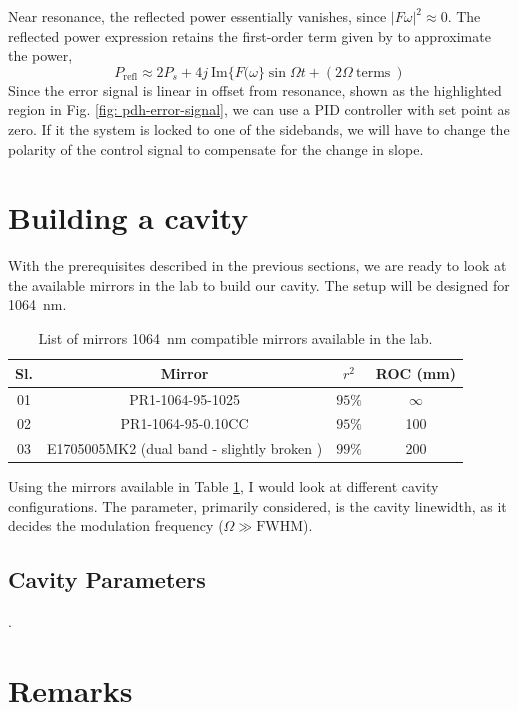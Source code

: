 \documentclass{Resources/cquicc}
\begin{document}
Near resonance, the reflected power essentially vanishes, since $|F \omega|^2 \approx 0$. The reflected power expression retains the first-order term given by to approximate the power, 
\begin{equation}
    P_{\text{refl}} \approx 2 P_s + 4 j~\mathrm{Im}\{F(\omega\}\sin \Omega t + (2\Omega ~\text{terms}~)
\end{equation}
Since the error signal is linear in offset from resonance, shown as the highlighted region in Fig. \ref{fig: pdh-error-signal}, we can use a PID controller with set point as zero. If it the system is locked to one of the sidebands, we will have to change the polarity of the control signal to compensate for the change in slope. 
\section{Building a cavity}
With the prerequisites described in the previous sections, we are ready to look at the available mirrors in the lab to build our cavity. The setup will be designed for 1064~nm. \par
\begin{table}[!h]
\centering
\begin{tabular}{|c|c|c|c|}
\hline
  Sl. &  Mirror & $r^2$ & ROC (mm) \\ \hline
    01 &PR1-1064-95-1025& $95\%$     & $\infty$ \\ \hline
    02 &PR1-1064-95-0.10CC & $95\%$ & 100 \\ \hline
    03 &E1705005MK2 (dual band - slightly broken ) & $99\%$ & 200\\
    \hline
\end{tabular}
    \caption{List of mirrors 1064~nm compatible mirrors available in the lab.}
    \label{tab: available_mirrors}
\end{table}
Using the mirrors available in Table \ref{tab: available_mirrors}, I would look at different cavity configurations. The parameter, primarily considered, is the cavity linewidth, as it decides the modulation frequency ($\Omega \gg\text{FWHM}$). 
\subsection{Cavity Parameters}
\lipsum[2]\cite{latex:companion}. \par
\section{Remarks}
\lipsum[4]

\end{document}

